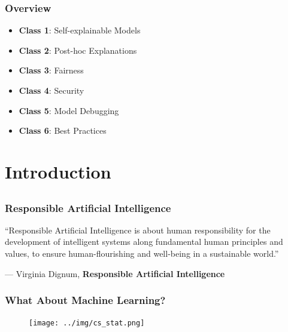 \documentclass[11pt,aspectratio=169,hyperref={colorlinks}]{beamer}
\begin{document}
	
	\begin{frame}
	
		\frametitle{Overview}
		
		\begin{itemize}
			\item{\textbf{Class 1}: Self-explainable Models}
			\item{\textbf{Class 2}: Post-hoc Explanations}
			\item{\textbf{Class 3}: Fairness}
			\item{\textbf{Class 4}: Security}
			\item{\textbf{Class 5}: Model Debugging}
			\item{\textbf{Class 6}: Best Practices}
		\end{itemize}
			
					
	\end{frame}

	\section{Introduction}
	
		\subsection*{}

		\begin{frame}
	
			\frametitle{Responsible Artificial Intelligence}
	
			\epigraph{“Responsible Artificial Intelligence is about human responsibility for the development of intelligent systems along fundamental human principles and values, to ensure human-flourishing and well-being in a sustainable world.”}{--- \textup{Virginia Dignum}, \textbf{Responsible Artificial Intelligence}}
	
		\end{frame}		

		\begin{frame}
	
			\frametitle{What About Machine Learning?}
			
			\begin{figure}[htb]
				\begin{center}
					\texttt{[image: ../img/cs\_stat.png]}
					\label{fig:cs_stat}
				\end{center}
			\end{figure}		
			
		\end{frame}	
\end{document}
